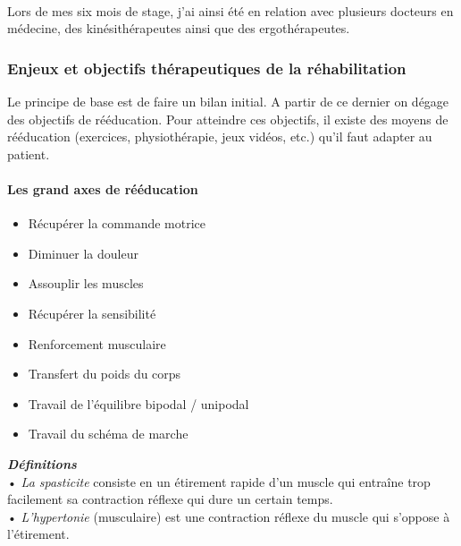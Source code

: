 	\paragraph{}
Lors de mes six mois de stage, j'ai ainsi été en relation avec plusieurs docteurs en médecine, des kinésithérapeutes ainsi que des ergothérapeutes.

	\subsubsection{Enjeux et objectifs thérapeutiques de la réhabilitation} \label{objectifs_therapeutiques}
Le principe de base est de faire un bilan initial.  A partir de ce dernier on dégage des objectifs  de rééducation. Pour atteindre ces objectifs, il existe des moyens de rééducation (exercices, physiothérapie, jeux vidéos, etc.) qu'il faut adapter au patient.

\paragraph{Les grand axes de rééducation}
\begin{itemize} 
	\item Récupérer la commande motrice 
	\item Diminuer la douleur
	\item Assouplir les muscles 
	\item Récupérer la sensibilité 
	\item Renforcement musculaire 
	\item Transfert du poids du corps 
	\item Travail de l'équilibre bipodal / unipodal 
	\item Travail du schéma de marche
\end{itemize}

	\textbf{\emph{Définitions}\\}
• \emph{La \gls{spasticite}} consiste en un étirement rapide d'un muscle qui entraîne trop facilement sa contraction réflexe qui dure un certain temps. \\
• \emph{L’\gls{hypertonie}} (musculaire) est une contraction réflexe du muscle qui s'oppose à l'étirement.\\

